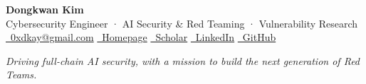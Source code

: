 \documentclass[11pt,letterpaper]{article}
\begin{document}
\begin{center}
    {\LARGE \textbf{Dongkwan Kim}} \\[2pt]
    Cybersecurity Engineer · AI Security \& Red Teaming · Vulnerability Research \\[4pt]
    \href{mailto:0xdkay@gmail.com}{\faEnvelope\ 0xdkay@gmail.com} \quad
    \href{https://0xdkay.me}{\faHome\ Homepage} \quad
    \href{https://scholar.google.com/citations?hl=ko&user=p16UJy8AAAAJ&view_op=list_works&sortby=pubdate}{\faGraduationCap\ Scholar} \quad
    \href{https://www.linkedin.com/in/0xdkay/}{\faLinkedin\ LinkedIn} \quad
    \href{https://github.com/0xdkay}{\faGithub\ GitHub}
\end{center}

\begin{center}
\textit{Driving full-chain AI security, with a mission to build the next generation of Red Teams.}
\end{center}


\end{document}
